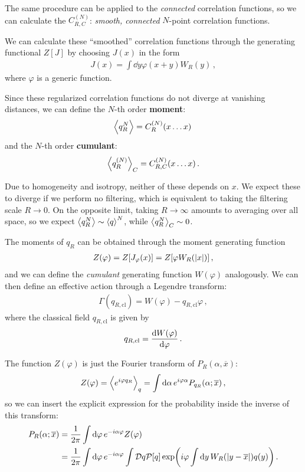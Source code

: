 \documentclass[main.tex]{subfiles}
\begin{document}
The same procedure can be applied to the \emph{connected} correlation functions, so we can calculate the \(C^{(N)}_{R, C}\): \emph{smooth, connected} \(N\)-point correlation functions. 

We can calculate these ``smoothed'' correlation functions through the generating functional \(Z[J]\) by choosing \(J(x)\) in the form 
%
\begin{align}
J(x) =\int \dd{y} \varphi (x+y) W_R (y)
\,,
\end{align}
%
where \(\varphi \) is a generic function.

Since these regularized correlation functions do not diverge at vanishing distances, we can define the \(N\)-th order \textbf{moment}:
%
\begin{align}
\expval{q_R^{N}} = C^{(N)}_R (x \dots x) 
\,
\end{align}
%
and the \(N\)-th order \textbf{cumulant}: 
%
\begin{align}
\expval{q_R^{(N)}}_C = C^{(N)}_{R, C} (x \dots x)
\,.
\end{align}

Due to homogeneity and isotropy, neither of these depends on \(x\). 
We expect these to diverge if we perform no filtering, which is equivalent to taking the filtering scale \(R \to 0\).
On the opposite limit, taking \(R \to \infty \) amounts to averaging over all space, so we expect \(\expval{q_R^{N}} \sim \expval{q}^{N}\), while \(\expval{q_R^{N}}_C \sim 0\). 

The moments of \(q_R\) can be obtained through the moment generating function 
%
\begin{align}
Z(\varphi ) = Z[J_\varphi (x) ] = Z[\varphi W_R (\abs{x})]
\,,
\end{align}
%
and we can define the \emph{cumulant} generating function \(W(\varphi )\) analogously. 
We can then define an effective action through a Legendre transform:
%
\begin{align}
\Gamma (q_{R, \text{cl}}) = W(\varphi ) - q_{R, \text{cl}} \varphi 
\,,
\end{align}
%
where the classical field \(q_{R, \text{cl}}\) is given by 
%
\begin{align}
q_{R, \text{cl}} = \dv{W(\varphi )}{\varphi }
\,.
\end{align}

The function \(Z(\varphi )\) is just the Fourier transform of \(P_R(\alpha , \overline{x})\): 
%
\begin{align}
Z(\varphi ) = \expval{e^{i \varphi q_R}}_q 
= \int  \dd{\alpha } e^{i \varphi \alpha } P_{q_R} (\alpha ; \overline{x}) 
\,,
\end{align}
%
so we can insert the explicit expression for the probability inside the inverse of this transform: 
%
\begin{align}
P_R(\alpha ; \overline{x}) &= \frac{1}{2 \pi } \int \dd{\varphi } e^{-i \alpha \varphi } Z(\varphi ) \\
&= \frac{1}{2 \pi } \int \dd{\varphi } e^{-i \alpha \varphi }
\int \mathcal{D}q \mathcal{P}[q] \exp(i \varphi \int \dd{y} W_R (\abs{y - \overline{x}}) q(y) )
\,.
\end{align}
\end{document}
